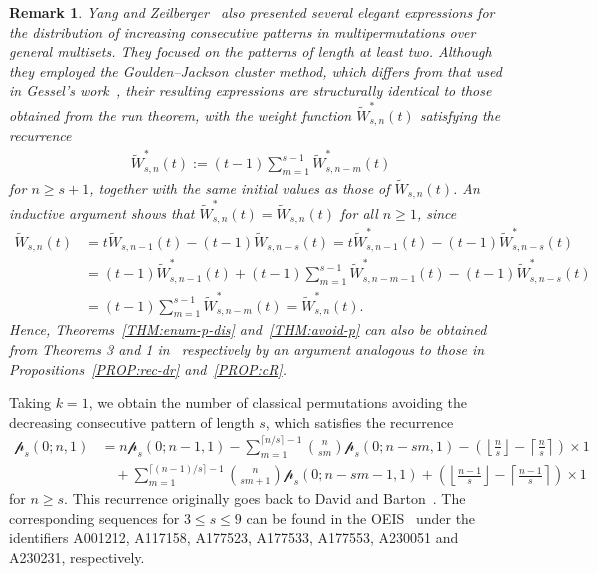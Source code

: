\documentclass[11pt]{article}
\numberwithin{equation}{section}
\newtheorem{rem}[thm]{Remark}
\newcommand{\cp}{\mathcal{p}}
\begin{document}
\begin{rem}
	Yang and Zeilberger~\cite{Yang2020} also presented several elegant expressions for the distribution of increasing consecutive patterns in multipermutations over general multisets. They focused on the patterns of length at least two. Although they employed the Goulden--Jackson cluster method, which differs from that used in Gessel's work~\cite{Gessel1977}, their resulting expressions are structurally identical to those obtained from the run theorem, with the weight function $\tilde{W}^*_{s,n}(t)$ satisfying the recurrence
	\begin{align*}
	\tilde{W}^*_{s,n}(t):=
	(t-1)\sum_{m=1}^{s-1}\tilde{W}^*_{s,n-m}(t) %
	\end{align*}
	for $n\geq s+1$, together with the same initial values as those of $\tilde{W}_{s,n}(t)$. An inductive argument shows that $\tilde{W}^*_{s,n}(t)=\tilde{W}_{s,n}(t)$ for all $n\ge 1$, since
	\begin{align*}
	\tilde{W}_{s,n}(t)&=t\tilde{W}_{s,n-1}(t)-(t-1)\tilde{W}_{s,n-s}(t)
	=t\tilde{W}^*_{s,n-1}(t)-(t-1)\tilde{W}^*_{s,n-s}(t)\\
	&=(t-1)\tilde{W}^*_{s,n-1}(t)+(t-1)\sum_{m=1}^{s-1}\tilde{W}^*_{s,n-m-1}(t)-(t-1)\tilde{W}^*_{s,n-s}(t)\\
	&=(t-1)\sum_{m=1}^{s-1}\tilde{W}^*_{s,n-m}(t)=\tilde{W}^*_{s,n}(t).
	\end{align*}
	Hence, Theorems~\ref{THM:enum-p-dis} and~\ref{THM:avoid-p} can also be obtained from Theorems 3 and 1 in~\cite{Yang2020} respectively by an argument analogous to those in Propositions~\ref{PROP:rec-dr} and~\ref{PROP:cR}.
\end{rem}


Taking $k=1$, we obtain the number of classical permutations avoiding the decreasing consecutive pattern of length $s$, which satisfies the recurrence
\begin{align*}
\cp_s(0;n,1)
&= n\cp_s(0;n-1,1)
-\sum_{m=1}^{\lceil n/s \rceil-1} \binom{n}{sm}\cp_s(0;n-sm,1)
-\left(\left\lfloor \frac{n}{s} \right\rfloor - \left\lceil \frac{n}{s} \right\rceil \right)\times1\\
&\quad +\sum_{m=1}^{\lceil (n-1)/s \rceil-1} \binom{n}{sm+1}\cp_s(0;n-sm-1,1)
+\left(\left\lfloor \frac{n-1}{s} \right\rfloor - \left\lceil \frac{n-1}{s} \right\rceil \right)\times1
\end{align*}
for $n\ge s$. This recurrence originally goes back to David and Barton~\cite{David1962}. The corresponding sequences for $3\le s\le 9$ can be found in the OEIS~\cite{oeis} under the identifiers A001212, A117158, A177523, A177533, A177553, A230051 and A230231, respectively.
\end{document}

